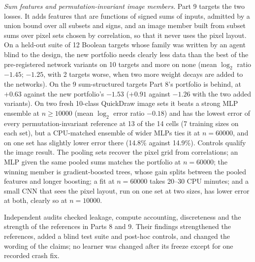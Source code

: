 \emph{Sum features and permutation-invariant image members.} Part 9 targets the two losses. It adds features that are functions of signed sums of inputs, admitted by a union bound over all subsets and signs, and an image member built from subset sums over pixel sets chosen by correlation, so that it never uses the pixel layout. On a held-out suite of 12 Boolean targets whose family was written by an agent blind to the design, the new portfolio needs clearly less data than the best of the pre-registered network variants on 10 targets and more on none (mean $\log_2$ ratio $-1.45$; $-1.25$, with 2 targets worse, when two more weight decays are added to the networks). On the 9 sum-structured targets Part 8's portfolio is behind, at $+0.63$ against the new portfolio's $-1.53$ ($+0.91$ against $-1.26$ with the two added variants). On two fresh 10-class QuickDraw image sets it beats a strong MLP ensemble at $n\ge10000$ (mean $\log_2$ error ratio $-0.18$) and has the lowest error of every permutation-invariant reference at 13 of the 14 cells (7 training sizes on each set), but a CPU-matched ensemble of wider MLPs ties it at $n=60000$, and on one set has slightly lower error there (14.8\% against 14.9\%). Controls qualify the image result. The pooling sets recover the pixel grid from correlations; an MLP given the same pooled sums matches the portfolio at $n=60000$; the winning member is gradient-boosted trees, whose gain splits between the pooled features and longer boosting; a fit at $n=60000$ takes 20--30 CPU minutes; and a small CNN that sees the pixel layout, run on one set at two sizes, has lower error at both, clearly so at $n=10000$.

Independent audits checked leakage, compute accounting, discreteness and the strength of the references in Parts 8 and 9. Their findings strengthened the references, added a blind test suite and post-hoc controls, and changed the wording of the claims; no learner was changed after its freeze except for one recorded crash fix.
